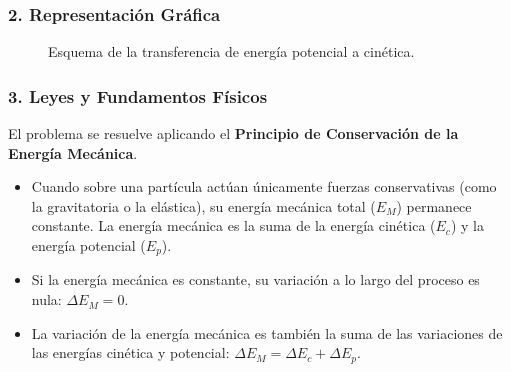 \subsubsection*{2. Representación Gráfica}
\begin{figure}[H]
    \centering
    \caption{Esquema de la transferencia de energía potencial a cinética.}
\end{figure}

\subsubsection*{3. Leyes y Fundamentos Físicos}
El problema se resuelve aplicando el \textbf{Principio de Conservación de la Energía Mecánica}.
\begin{itemize}
    \item Cuando sobre una partícula actúan únicamente fuerzas conservativas (como la gravitatoria o la elástica), su energía mecánica total ($E_M$) permanece constante. La energía mecánica es la suma de la energía cinética ($E_c$) y la energía potencial ($E_p$).
    \item Si la energía mecánica es constante, su variación a lo largo del proceso es nula: $\Delta E_M = 0$.
    \item La variación de la energía mecánica es también la suma de las variaciones de las energías cinética y potencial: $\Delta E_M = \Delta E_c + \Delta E_p$.
\end{itemize}

